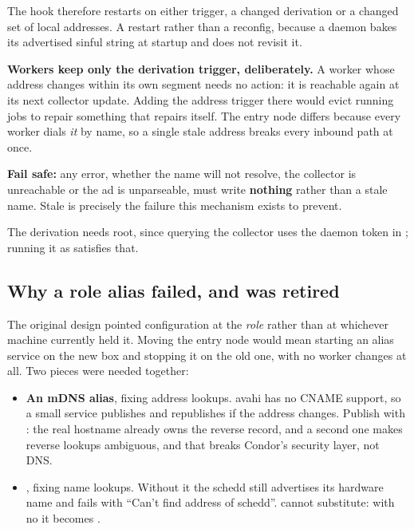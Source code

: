 The hook therefore restarts on either trigger, a changed derivation or a changed
set of local addresses. A restart rather than a reconfig, because a daemon bakes
its advertised sinful string at startup and  does not
revisit it.

\textbf{Workers keep only the derivation trigger, deliberately.} A worker whose
address changes within its own segment needs no action: it is reachable again at
its next collector update. Adding the address trigger there would evict running
jobs to repair something that repairs itself. The entry node differs because
every worker dials \emph{it} by name, so a single stale address breaks every
inbound path at once.

\textbf{Fail safe:} any error, whether the name will not resolve, the collector
is unreachable or the ad is unparseable, must write \textbf{nothing} rather than
a stale name. Stale is precisely the failure this mechanism exists to prevent.

The derivation needs root, since querying the collector uses the daemon token in
; running it as  satisfies that.

\subsection{Why a role alias failed, and was retired}

The original design pointed configuration at the \emph{role} rather than at
whichever machine currently held it. Moving the entry node would mean starting an
alias service on the new box and stopping it on the old one, with no worker
changes at all. Two pieces were needed together:

\begin{itemize}
  \item \textbf{An mDNS alias}, fixing address lookups. avahi has no CNAME
        support, so a small service publishes  and
        republishes if the address changes. Publish with : the real
        hostname already owns the reverse record, and a second one makes reverse
        lookups ambiguous, and that breaks Condor's security layer, not DNS.
  \item \textbf{}, fixing name lookups. Without it the
        schedd still advertises its hardware name and  fails
        with ``Can't find address of schedd''.  cannot
        substitute: with no  it becomes
        .
\end{itemize}

